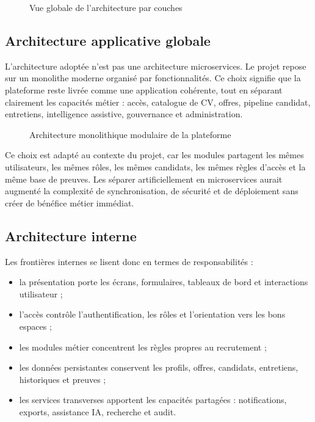 \begin{figure}[H]
  \centering
  \caption{\label{fig:layered-architecture}Vue globale de l'architecture par couches}
\end{figure}

\subsection{Architecture applicative globale}
L'architecture adoptée n'est pas une architecture microservices. Le projet repose sur un monolithe moderne organisé par fonctionnalités. Ce choix signifie que la plateforme reste livrée comme une application cohérente, tout en séparant clairement les capacités métier : accès, catalogue de CV, offres, pipeline candidat, entretiens, intelligence assistive, gouvernance et administration.

\begin{figure}[H]
  \centering
  \caption{\label{fig:monolithic-architecture}Architecture monolithique modulaire de la plateforme}
\end{figure}

Ce choix est adapté au contexte du projet, car les modules partagent les mêmes utilisateurs, les mêmes rôles, les mêmes candidats, les mêmes règles d'accès et la même base de preuves. Les séparer artificiellement en microservices aurait augmenté la complexité de synchronisation, de sécurité et de déploiement sans créer de bénéfice métier immédiat.

\subsection{Architecture interne}
Les frontières internes se lisent donc en termes de responsabilités :
\begin{itemize}
  \item la présentation porte les écrans, formulaires, tableaux de bord et interactions utilisateur ;
  \item l'accès contrôle l'authentification, les rôles et l'orientation vers les bons espaces ;
  \item les modules métier concentrent les règles propres au recrutement ;
  \item les données persistantes conservent les profils, offres, candidats, entretiens, historiques et preuves ;
  \item les services transverses apportent les capacités partagées : notifications, exports, assistance IA, recherche et audit.
\end{itemize}

